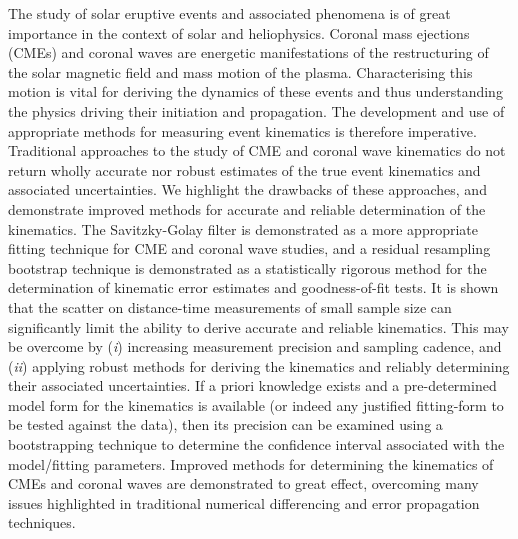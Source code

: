 \documentclass[structabstract]{aa}
\begin{document}
\date{Received 1 February 2013 / Accepted 26 July 2013}
\abstract
{The study of solar eruptive events and associated phenomena is of great importance in the context of solar and heliophysics. Coronal mass ejections (CMEs) and coronal waves are energetic manifestations of the restructuring of the solar magnetic field and mass motion of the plasma. Characterising this motion is vital for deriving the dynamics of these events and thus understanding the physics driving their initiation and propagation. The development and use of appropriate methods for measuring event kinematics is therefore imperative.} 
{Traditional approaches to the study of CME and coronal wave kinematics do not return wholly accurate nor robust estimates of the true event kinematics and associated uncertainties. We highlight the drawbacks of these approaches, and demonstrate improved methods for accurate and reliable determination of the kinematics.}
{The Savitzky-Golay filter is demonstrated as a more appropriate fitting technique for CME and coronal wave studies, and a residual resampling bootstrap technique is demonstrated as a statistically rigorous method for the determination of kinematic error estimates and goodness-of-fit tests.}
{It is shown that the scatter on distance-time measurements of small sample size can significantly limit the ability to derive accurate and reliable kinematics. This may be overcome by (\emph{i}) increasing measurement precision and sampling cadence, and (\emph{ii}) applying robust methods for deriving the kinematics and reliably determining their associated uncertainties. If a priori knowledge exists and a pre-determined model form for the kinematics is available (or indeed any justified fitting-form to be tested against the data), then its precision can be examined using a bootstrapping technique to determine the confidence interval associated with the model/fitting parameters.}
{Improved methods for determining the kinematics of CMEs and coronal waves are demonstrated to great effect, overcoming many issues highlighted in traditional numerical differencing and error propagation techniques.}



\maketitle
\end{document}
